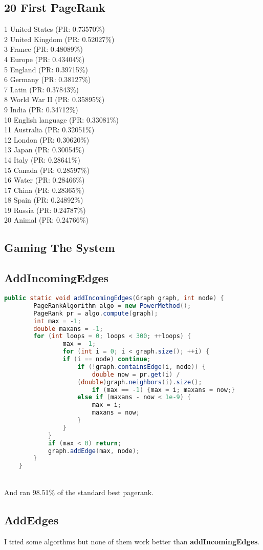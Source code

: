\documentclass[11pt]{article} %
\begin{document}
\subsection{20 First PageRank}
1    United States (PR: 0.73570\%)\\
2    United Kingdom (PR: 0.52027\%)\\
3    France (PR: 0.48089\%)\\
4    Europe (PR: 0.43404\%)\\
5    England (PR: 0.39715\%)\\
6    Germany (PR: 0.38127\%)\\
7    Latin (PR: 0.37843\%)\\
8    World War II (PR: 0.35895\%)\\
9    India (PR: 0.34712\%)\\
10   English language (PR: 0.33081\%)\\
11   Australia (PR: 0.32051\%)\\
12   London (PR: 0.30620\%)\\
13   Japan (PR: 0.30054\%)\\
14   Italy (PR: 0.28641\%)\\
15   Canada (PR: 0.28597\%)\\
16   Water (PR: 0.28466\%)\\
17   China (PR: 0.28365\%)\\
18   Spain (PR: 0.24892\%)\\
19   Russia (PR: 0.24787\%)\\
20   Animal (PR: 0.24766\%)\\

\subsection{Gaming The System}

\subsection{AddIncomingEdges}

\begin{lstlisting}[language=JAVA]
public static void addIncomingEdges(Graph graph, int node) {
    	PageRankAlgorithm algo = new PowerMethod();
        PageRank pr = algo.compute(graph);
        int max = -1;
        double maxans = -1;
        for (int loops = 0; loops < 300; ++loops) {
        		max = -1;
        		for (int i = 0; i < graph.size(); ++i) {
    			if (i == node) continue;
            		if (!graph.containsEdge(i, node)) {
            			double now = pr.get(i) /
					(double)graph.neighbors(i).size();
            			if (max == -1) {max = i; maxans = now;}
            		else if (maxans - now < 1e-9) {
            			max = i;
            			maxans = now;
            		}
            	}
        	}
        	if (max < 0) return;
    		graph.addEdge(max, node);
        }
    }
\end{lstlisting}
\\And ran 98.51\% of the standard best pagerank. \\
\subsection{AddEdges}
I tried some algorthms but none of them work better than \textbf{addIncomingEdges}.
\end{document}
